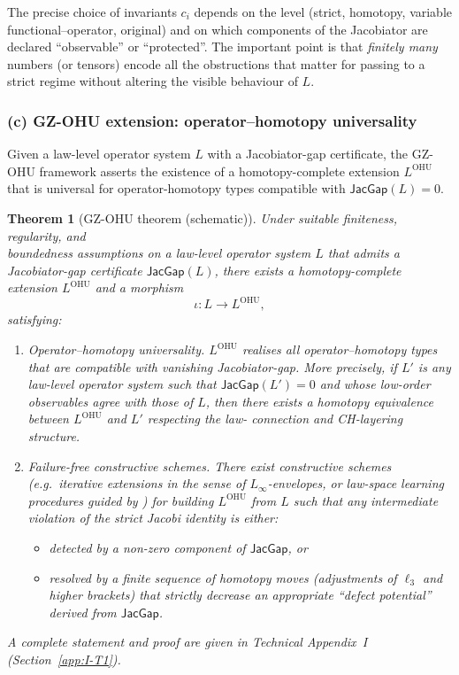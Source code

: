 \documentclass[11pt]{book}
\theoremstyle{plain}
\newtheorem{theorem}{Theorem}[chapter]      \newtheorem{proposition}[theorem]{Proposition} \newtheorem{lemma}[theorem]{Lemma}          \newtheorem{corollary}[theorem]{Corollary}
\theoremstyle{definition}
\begin{document}
The precise choice of invariants $c_i$ depends on the level (strict,
homotopy, variable functional--operator, original) and on which
components of the Jacobiator are declared “observable” or “protected”.
The important point is that \emph{finitely many} numbers (or tensors)
encode all the obstructions that matter for passing to a strict regime
without altering the visible behaviour of $L$.

\subsubsection*{(c) GZ-OHU extension: operator--homotopy universality}

Given a law-level operator system $L$ with a Jacobiator-gap certificate,
the GZ-OHU framework asserts the existence of a homotopy-complete
extension $L^{\mathrm{OHU}}$ that is universal for operator-homotopy
types compatible with $\mathsf{JacGap}(L)=0$.

\begin{theorem}[GZ-OHU theorem (schematic)]
  Under suitable finiteness, regularity, and \\ boundedness assumptions on
  a law-level operator system $L$ that admits a Jacobiator-gap
  certificate $\mathsf{JacGap}(L)$, there exists a homotopy-complete
  extension $L^{\mathrm{OHU}}$ and a morphism
  \[
    \iota : L \longrightarrow L^{\mathrm{OHU}},
  \]
  satisfying:
  \begin{enumerate}[label=\roman*)]
    \item \emph{Operator--homotopy universality.}
          $L^{\mathrm{OHU}}$ realises all operator--homotopy types that
          are compatible with vanishing Jacobiator-gap. More precisely,
          if $L'$ is any law-level operator system such that
          $\mathsf{JacGap}(L')=0$ and whose low-order observables agree
          with those of $L$, then there exists a homotopy equivalence
          between $L^{\mathrm{OHU}}$ and $L'$ respecting the law-
          connection and CH-layering structure.
    \item \emph{Failure-free constructive schemes.}
          There exist constructive schemes (e.g.\ iterative extensions
          in the sense of $L_\infty$-envelopes, or law-space learning
          procedures guided by \GZTLC) for building $L^{\mathrm{OHU}}$
          from $L$ such that any intermediate violation of the strict
          Jacobi identity is either:
          \begin{itemize}
            \item detected by a non-zero component of
                  $\mathsf{JacGap}$, or
            \item resolved by a finite sequence of homotopy moves
                  (adjustments of $\ell_3$ and higher brackets) that
                  strictly decrease an appropriate “defect potential”
                  derived from $\mathsf{JacGap}$.
          \end{itemize}
  \end{enumerate}
  A complete statement and proof are given in Technical Appendix~I
  (Section~\ref{app:I-T1}).
\end{theorem}
\end{document}
